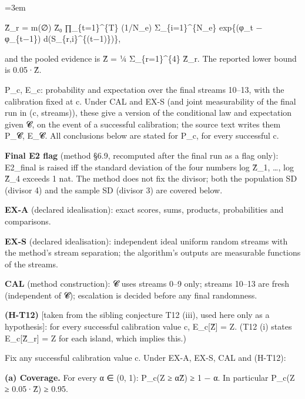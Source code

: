 \documentclass[11pt]{report}
\newenvironment{mdblock}{\begingroup\mdfont\raggedright\setlength{\parindent}{0pt}\setlength{\parskip}{0.55em}\emergencystretch=3em}{\par\endgroup}
\newcommand{\mdhead}[2]{\par\vspace{0.7em}\noindent{\bfseries\ifcase#1\or\large\or\normalsize\or\normalsize\or\small\or\small\or\small\fi #2}\par\nopagebreak\vspace{0.1em}}
\begin{document}
\begin{mdblock}
\begin{mdbul}
Ẑ\_r = m(∅) Z̄₀ ∏\_\{t=1\}\textasciicircum{}\{T\} (1/N\_e) Σ\_\{i=1\}\textasciicircum{}\{N\_e\} exp\{(φ\_t − φ\_\{t−1\}) d(S\_\{r,i\}\textasciicircum{}\{(t−1)\})\},

and the pooled evidence is Ẑ = ¼ Σ\_\{r=1\}\textasciicircum{}\{4\} Ẑ\_r. The reported lower bound is 0.05·Ẑ.
\item P\_c, E\_c: probability and expectation over the final streams 10–13, with the calibration fixed at c. Under CAL and EX-S (and joint measurability of the final run in (c, streams)), these give a version of the conditional law and expectation given 𝓒, on the event of a successful calibration; the source text writes them P\_𝓒, E\_𝓒. All conclusions below are stated for P\_c, for every successful c.
\item \textbf{Final E2 flag} (method §6.9, recomputed after the final run as a flag only): E2\_final is raised iff the standard deviation of the four numbers log Ẑ\_1, …, log Ẑ\_4 exceeds 1 nat. The method does not fix the divisor; both the population SD (divisor 4) and the sample SD (divisor 3) are covered below.
\end{mdbul}

\mdhead{2}{2. Assumptions}

\begin{mdbul}
\item \textbf{EX-A} (declared idealisation): exact scores, sums, products, probabilities and comparisons.
\item \textbf{EX-S} (declared idealisation): independent ideal uniform random streams with the method's stream separation; the algorithm's outputs are measurable functions of the streams.
\item \textbf{CAL} (method construction): 𝓒 uses streams 0–9 only; streams 10–13 are fresh (independent of 𝓒); escalation is decided before any final randomness.
\item \textbf{(H-T12)} [taken from the sibling conjecture T12 (iii), used here only as a hypothesis]: for every successful calibration value c, E\_c[Ẑ] = Z. (T12 (i) states E\_c[Ẑ\_r] = Z for each island, which implies this.)
\end{mdbul}

\mdhead{2}{3. Conclusions to prove}

Fix any successful calibration value c. Under EX-A, EX-S, CAL and (H-T12):

\textbf{(a) Coverage.} For every α ∈ (0, 1): P\_c(Z ≥ αẐ) ≥ 1 − α. In particular P\_c(Z ≥ 0.05·Ẑ) ≥ 0.95.


\end{mdblock}
\end{document}
